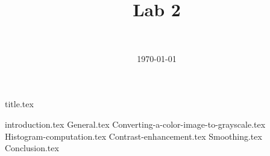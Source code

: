\documentclass[final]{report} %
\title{Lab 2}
\author{~}
\date{\today}
\begin{document}

{title.tex}
\newpage
\tableofcontents

\newpage
{}
{introduction.tex}
{General.tex}
{Converting-a-color-image-to-grayscale.tex}
{Histogram-computation.tex}
{Contrast-enhancement.tex}
{Smoothing.tex}
{Conclusion.tex}
\newpage
{}

\printbibliography
\end{document}
